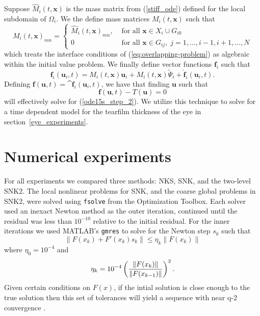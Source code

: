 Suppose $\hat{M}_i(t,\bm{x})$ is the mass matrix from (\ref{stiff_ode}) defined for the local subdomain of $\Omega_i$. We the define mass matrices $M_i(t,\bm{x})$ such that
\begin{equation}
	M_i(t,\bm{x})_{mn} = 
  \begin{cases}
    \hat{M}_i(t,\bm{x})_{mn}, & \text{ for all } \bm{x} \in X_i \cup G_{i0} \\
    0 & \text{ for all } \bm{x} \in G_{ij}, \; j=1,\ldots,i-1,i+1,\ldots,N
  \end{cases}
\end{equation}
which treats the interface conditions of (\ref{eq:overlapping-problem}) as algebraic within the initial value problem. We finally define vector functions $\bm{f}_i$ such that
\begin{equation}
	\bm{f}_i(\bm{u}_i,t) = M_i(t,\bm{x})\bm{u}_i+M_i(t,\bm{x}) \tilde{\Psi}_i+\bm{\hat{f}}_i(\bm{u}_i,t).
\end{equation}
Defining $\bm{f}(\bm{u},t)=\cat{\bm{f}_i(\bm{u}_i,t)}$, we have that finding $\bm{u}$ such that
\begin{equation}
\bm{f}(\bm{u},t) - T(\bm{u})	 = 0
\end{equation}
will effectively solve for (\ref{ode15s_step_2}). We utilize this technique to solve for a time dependent model for the tearfilm thickness of the eye in section~\ref{eye_experiments}.
 
\section{Numerical experiments}
\label{sec:experiments}

For all experiments we compared three methods: NKS, SNK, and the two-level SNK2. The local nonlinear problems for SNK, and the coarse global problems in SNK2, were solved using \texttt{fsolve} from the Optimization Toolbox. Each solver used an inexact Newton method as the outer iteration, continued until the residual was less than $10^{-10}$ relative to the initial residual. For the inner iterations we used MATLAB's \texttt{gmres} to solve for the Newton step $s_k$ such that
\begin{equation}
  \| F(x_k) + F'(x_k)s_k \| \leq \eta_k \| F(x_k) \|	
\end{equation}
where $\eta_0 = 10^{-4}$ and
\begin{equation}
  \label{eq:forcing}
  \eta_k = 10^{-4} \left( \frac{\| F(x_k) \|}{\| F(x_{k-1})\|} \right)^2.	
\end{equation}
Given certain conditions on $F(x)$, if the intial solution is close enough to the true solution then this set of tolerances will yield a sequence with near q-2 convergence \cite{Eisenstat1996}. 


